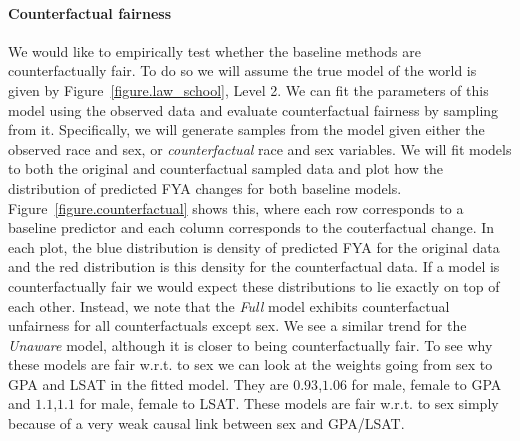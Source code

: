 \paragraph{Counterfactual fairness}
We would like to empirically test whether the baseline methods are counterfactually fair. To do so we will assume the true model of the world is given by Figure~\ref{figure.law_school}, Level 2. We can fit the parameters of this model using the observed data and evaluate counterfactual fairness by sampling from it. Specifically, we will generate samples from the model given either the observed race and sex, or \emph{counterfactual} race and sex variables. We will fit models to both the original and counterfactual sampled data and plot how the distribution of predicted FYA changes for both baseline models. Figure~\ref{figure.counterfactual} shows this, where each row corresponds to a baseline predictor and each column corresponds to the couterfactual change. In each plot, the blue distribution is density of predicted FYA for the original data and the red distribution is this density for the counterfactual data. If a model is counterfactually fair we would expect these distributions to lie exactly on top of each other. Instead, we note that the \emph{Full} model exhibits counterfactual unfairness for all counterfactuals except sex. We see a similar trend for the \emph{Unaware} model, although it is closer to being counterfactually fair.
To see why these models are fair w.r.t. to sex we can look at the
weights going from sex to GPA and LSAT in the fitted model. They are
$0.93$,$1.06$ for male, female to GPA and $1.1$,$1.1$ for male, female
to LSAT. These models are fair w.r.t. to sex simply
because of a very weak causal link between sex and GPA/LSAT.


 


